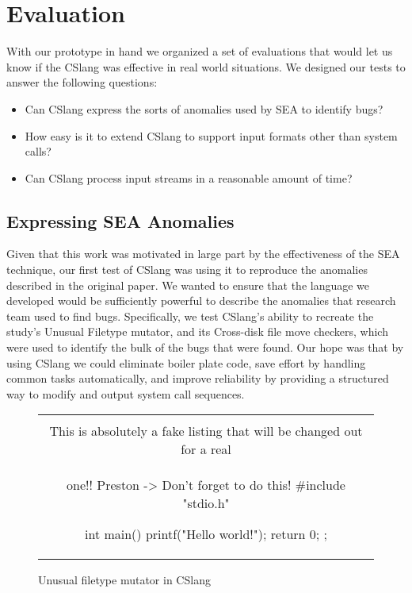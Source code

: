 \section{Evaluation}
\label{SEC:evaluation}

With our prototype in hand we organized a set of
evaluations that would let us know if the CSlang was effective
in real world situations.
We designed our tests to answer the following questions:

\begin{itemize}

  \item{Can CSlang express the sorts of anomalies used by SEA to identify
    bugs?}

  \item{How easy is it to extend CSlang to support input formats other than
    system calls?}

  \item{Can CSlang process input streams in a reasonable amount of time?}

\end{itemize}


\subsection{Expressing SEA Anomalies}
\label{sub:SEAAnomalies}
Given that this work was motivated
in large part
by the effectiveness of the SEA technique,
our first test of CSlang was using it to reproduce the anomalies described
in the original paper.
We wanted to ensure that
the language we developed
would be sufficiently powerful
to describe the anomalies that
research team used to
find bugs.
Specifically, we test CSlang's ability to recreate
the study's Unusual Filetype mutator,
and its Cross-disk file move checkers, which were used to identify
the bulk of
the bugs that were found.
Our hope was that by using CSlang we could eliminate boiler plate code,
save effort by handling common tasks automatically, and improve reliability
by providing a structured way to modify and output system call sequences.

\begin{figure}[H]
\centering
\begin{tabular}{c}
\begin{lstlisting}
\\ This is absolutely a fake listing that will be changed out for a real
\\ one!!  Preston -> Don't forget to do this!
#include "stdio.h"

int main() {
    printf("Hello world!\n");
    return 0;
};
\end{lstlisting}
\end{tabular}
\caption{Unusual filetype mutator in CSlang}
\label{lst:UnusualFiletypeCSlang}
\end{figure}

